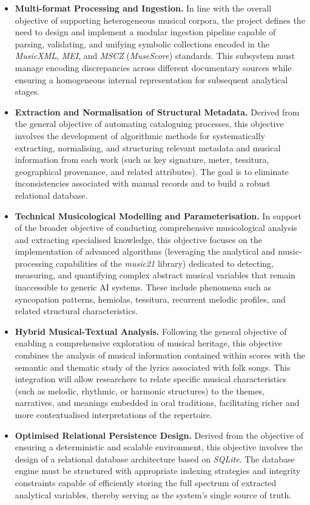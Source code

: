 \begin{itemize}
\item \textbf{Multi-format Processing and Ingestion.} In line with the overall objective of supporting heterogeneous musical corpora, the project defines the need to design and implement a modular ingestion pipeline capable of parsing, validating, and unifying symbolic collections encoded in the \textit{MusicXML}, \textit{MEI}, and \textit{MSCZ} (\textit{MuseScore}) standards. This subsystem must manage encoding discrepancies across different documentary sources while ensuring a homogeneous internal representation for subsequent analytical stages.
\item \textbf{Extraction and Normalisation of Structural Metadata.} Derived from the general objective of automating cataloguing processes, this objective involves the development of algorithmic methods for systematically extracting, normalising, and structuring relevant metadata and musical information from each work (such as key signature, meter, tessitura, geographical provenance, and related attributes). The goal is to eliminate inconsistencies associated with manual records and to build a robust relational database.
\item \textbf{Technical Musicological Modelling and Parameterisation.} In support of the broader objective of conducting comprehensive musicological analysis and extracting specialised knowledge, this objective focuses on the implementation of advanced algorithms (leveraging the analytical and music-processing capabilities of the \textit{music21} library) dedicated to detecting, measuring, and quantifying complex abstract musical variables that remain inaccessible to generic AI systems. These include phenomena such as syncopation patterns, hemiolas, tessitura, recurrent melodic profiles, and related structural characteristics.
\item \textbf{Hybrid Musical-Textual Analysis.} Following the general objective of enabling a comprehensive exploration of musical heritage, this objective combines the analysis of musical information contained within scores with the semantic and thematic study of the lyrics associated with folk songs. This integration will allow researchers to relate specific musical characteristics (such as melodic, rhythmic, or harmonic structures) to the themes, narratives, and meanings embedded in oral traditions, facilitating richer and more contextualised interpretations of the repertoire.
\item \textbf{Optimised Relational Persistence Design.} Derived from the objective of ensuring a deterministic and scalable environment, this objective involves the design of a relational database architecture based on \textit{SQLite}. The database engine must be structured with appropriate indexing strategies and integrity constraints capable of efficiently storing the full spectrum of extracted analytical variables, thereby serving as the system’s single source of truth.

\end{itemize}
